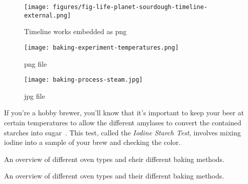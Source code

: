 \documentclass[paper=a4, twoside=false, fontsize=12pt, parskip=half,
                bibliography=totoc, listof=totoc]{scrbook}
\begin{document}
\begin{figure}[!htb]
  \texttt{[image: figures/fig-life-planet-sourdough-timeline-external.png]}
  \caption[Sourdough microbiology timeline]{Timeline works embedded as png}%
\end{figure}

\begin{figure}[!htb]
  \texttt{[image: baking-experiment-temperatures.png]}
  \caption[Surface temperature for different steaming methods]{png file}
\end{figure}

\begin{figure}[!htb]
  \texttt{[image: baking-process-steam.jpg]}
  \caption[Steam building with inverted tray]{jpg file}%
      \label{flc:inverted-tray}
\end{figure}
If you're a hobby brewer, you'll know that it's important to keep your beer at
certain temperatures to allow the different amylases to convert the contained
starches into sugar~\cite{beer+amylase}.
This test, called the \emph{Iodine Starch Test}, involves mixing iodine into
a sample of your brew and checking the color.

\begin{table}[!htb]
    \begin{center}
        
        \caption[Different oven types]{An overview of different oven types and
        eheir different baking methods.}
    \end{center}
\end{table}

\begin{table}[!htb]
    \begin{center}
        
        \caption[Different oven types]{An overview of different oven types and their
            different baking methods.}
    \end{center}
\end{table}
{%
\hypersetup{hidelinks}
\listofflowcharts
\listoftables
\listoffigures
}
\printbibliography
\end{document}
